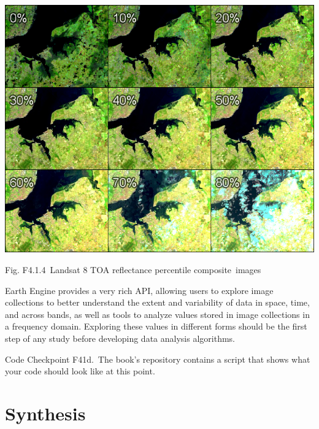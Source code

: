 \documentclass[
  letterpaper,
  DIV=11,
  numbers=noendperiod]{scrreprt}
\begin{document}
\includegraphics{./F4/image55.png}

Fig. F4.1.4~Landsat 8 TOA reflectance percentile composite~images

Earth Engine provides a very rich API, allowing users to explore image
collections to better understand the extent and variability of data in
space, time, and across bands, as well as tools to analyze values stored
in image collections in a frequency domain. Exploring these values in
different forms should be the first step of any study before developing
data analysis algorithms.

\begin{tcolorbox}[enhanced jigsaw, left=2mm, breakable, rightrule=.15mm, opacityback=0, colframe=quarto-callout-note-color-frame, colbacktitle=quarto-callout-note-color!10!white, arc=.35mm, opacitybacktitle=0.6, toptitle=1mm, colback=white, leftrule=.75mm, title=\textcolor{quarto-callout-note-color}{\faInfo}\hspace{0.5em}{Note}, toprule=.15mm, bottomtitle=1mm, titlerule=0mm, bottomrule=.15mm, coltitle=black]

Code Checkpoint F41d.~The book's repository contains a script that shows
what your code should look like at this point.

\end{tcolorbox}

\hypertarget{synthesis-4}{%
\section*{Synthesis}\label{synthesis-4}}
\end{document}
